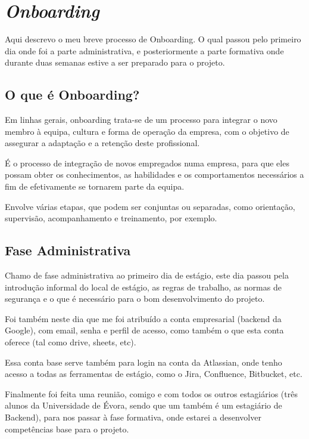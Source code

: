 \chapter{\textit{Onboarding}}\label{cap3}

Aqui descrevo o meu breve processo de Onboarding. O qual passou pelo primeiro dia onde foi a parte administrativa, e posteriormente a parte formativa onde durante duas semanas estive a ser preparado para o projeto.

\section{O que é Onboarding?}

Em linhas gerais, onboarding trata-se de um processo para integrar o novo membro à equipa, cultura e forma de operação da empresa, com o objetivo de assegurar a adaptação e a retenção deste profissional.

É o processo de integração de novos empregados numa empresa, para que eles possam obter os conhecimentos, as habilidades e os comportamentos necessários a fim de efetivamente se tornarem parte da equipa.

Envolve várias etapas, que podem ser conjuntas ou separadas, como orientação, supervisão, acompanhamento e treinamento, por exemplo.

\section{Fase Administrativa}

Chamo de fase administrativa ao primeiro dia de estágio, este dia passou pela introdução informal do local de estágio, as regras de trabalho, as normas de segurança e o que é necessário para o bom desenvolvimento do projeto.

Foi também neste dia que me foi atribuído a conta empresarial (backend da Google), com email, senha e perfil de acesso, como também o que esta conta oferece (tal como drive, sheets, etc).

Essa conta base serve também para login na conta da Atlassian, onde tenho acesso a todas as ferramentas de estágio, como o Jira, Confluence, Bitbucket, etc.

Finalmente foi feita uma reunião, comigo e com todos os outros estagiários (três alunos da Universidade de Évora, sendo que um também é um estagiário de Backend), para nos passar à fase formativa, onde estarei a desenvolver competências base para o projeto.


